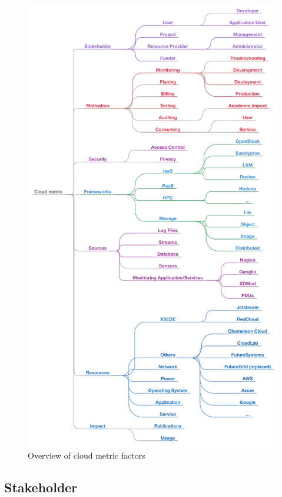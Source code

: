 \documentclass{sig-alternate-05-2015}
\begin{document}
\begin{figure}[h!] 
  \centering 
    \includegraphics[width=1.0\columnwidth]{images/cloudmetric.pdf} 
  \caption{Overview of cloud metric factors}\label{F:taxonomy-1} 
\end{figure} 

\subsection{Stakeholder}
\end{document}
